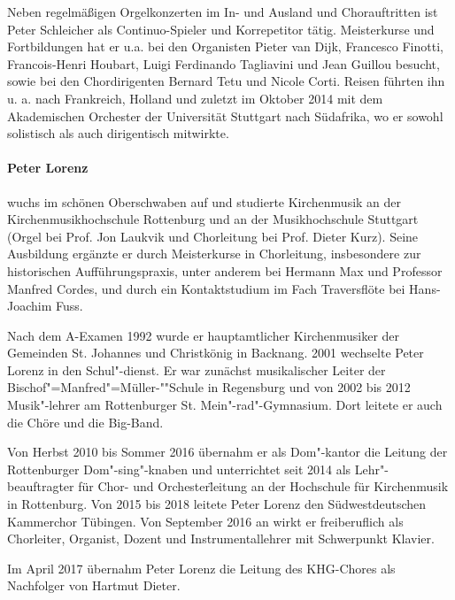 \documentclass[a5paper,twoside,fontsize=10pt]{scrartcl}
\begin{document}
Neben regelmäßigen Orgelkonzerten im In- und Ausland und Chorauftritten ist Peter Schleicher als Continuo-Spieler und Korrepetitor tätig.
Meisterkurse und Fortbildungen hat er u.a. bei den Organisten Pieter van Dijk, Francesco Finotti, Francois-Henri Houbart, Luigi Ferdinando Tagliavini und Jean Guillou besucht, sowie bei den Chordirigenten Bernard Tetu und Nicole Corti.
Reisen führten ihn u. a. nach Frankreich, Holland und zuletzt im Oktober 2014 mit dem Akademischen Orchester der Universität Stuttgart nach Südafrika, wo er sowohl solistisch als auch dirigentisch mitwirkte.


\paragraph{Peter Lorenz} wuchs im schönen Oberschwaben auf und studierte Kirchenmusik an der Kirchenmusikhochschule Rottenburg und an der Musikhochschule Stuttgart (Orgel bei Prof. Jon Laukvik und Chorleitung bei Prof. Dieter Kurz).
Seine Ausbildung ergänzte er durch Meisterkurse in Chorleitung, insbesondere zur historischen Aufführungspraxis, unter anderem bei Hermann Max und Professor Manfred Cordes, und durch ein Kontaktstudium im Fach Traversflöte bei Hans-Joachim Fuss.

Nach dem A-Examen 1992 wurde er hauptamtlicher Kirchenmusiker der Gemeinden St. Johannes und Christkönig in Backnang.
2001 wechselte Peter Lorenz in den Schul"-dienst.
Er war zunächst musikalischer Leiter der Bischof"=Manfred"=Müller-""Schule in Regensburg und von 2002 bis 2012 Musik"-lehrer am Rottenburger St. Mein"-rad"-Gymnasium.
Dort leitete er auch die Chöre und die Big-Band.

Von Herbst 2010 bis Sommer 2016 übernahm er als Dom"-kantor die Leitung der Rottenburger Dom"-sing"-knaben und unterrichtet seit 2014 als Lehr"-beauftragter für Chor- und Orchester\"leitung an der Hochschule für Kirchenmusik in Rottenburg.
Von 2015 bis 2018 leitete Peter Lorenz den Südwestdeutschen Kammerchor Tübingen.
Von September 2016 an wirkt er freiberuflich als Chorleiter, Organist, Dozent und Instrumentallehrer mit Schwerpunkt Klavier.

Im April 2017 übernahm Peter Lorenz die Leitung des KHG-Chores als Nachfolger von Hartmut Dieter.
\end{document}
